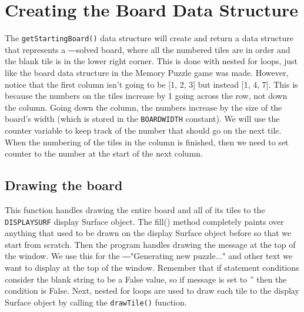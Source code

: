 \section{Creating the Board Data Structure} %
\label{sec:subsection label} %
The \texttt{getStartingBoard()} data structure will create and return a data structure that represents a ―solved board, where all the numbered tiles are in order and the blank tile is in the lower right corner. This is done with nested for loops, just like the board data structure in the Memory Puzzle game was made.
However, notice that the first column isn’t going to be [1, 2, 3] but instead [1, 4, 7]. This is because the numbers on the tiles increase by 1 going across the row, not down the column. Going down the column, the numbers increase by the size of the board’s width (which is stored in the \texttt{BOARDWIDTH} constant). We will use the counter variable to keep track of the number that should go on the next tile. When the numbering of the tiles in the column is finished, then we need to set counter to the number at the start of the next column.
\subsection{Drawing the board} %
\label{sec:subsection label} %
This function handles drawing the entire board and all of its tiles to the \texttt{DISPLAYSURF} display Surface object. The fill() method completely paints over anything that used to be drawn on the display Surface object before so that we start from scratch.
Then the program handles drawing the message at the top of the window. We use this for the ―"Generating new puzzle..." and other text we want to display at the top of the window. Remember that if statement conditions consider the blank string to be a False value, so if message is set to '' then the condition is False.
Next, nested for loops are used to draw each tile to the display Surface object by calling the \texttt{drawTile()} function.
